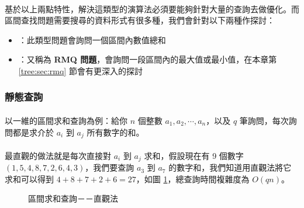 \documentclass[12pt,a4paper,oneside]{report}
\begin{document}
\begin{CJK}{UTF8}{bkai}
\paragraph{}基於以上兩點特性，解決這類型的演算法必須要能夠針對大量的查詢去做優化。而區間查找問題需要搜尋的資料形式有很多種，我們會針對以下兩種作探討：
\begin{itemize}
\item {}：此類型問題會詢問一個區間內數值總和
\item {}：又稱為 \textbf{RMQ 問題}，會詢問一段區間內的最大值或最小值，在本章第 \ref{tree:sec:rmq} 節會有更深入的探討
\end{itemize}

\subsubsection{靜態查詢}

\paragraph{}以一維的區間求和查詢為例：給你 $n$ 個整數 $a_1,a_2,\cdots{},a_n$，以及 $q$ 筆詢問，每次詢問都是求介於 $a_i$ 到 $a_j$ 所有數字的和。

\paragraph{}最直觀的做法就是每次直接對 $a_i$ 到 $a_j$ 求和，假設現在有 9 個數字 $(1,5,4,8,7,2,6,4,3)$，我們要查詢 $a_3$ 到 $a_7$ 的數字和，我們知道用直觀法將它求和可以得到 $4+8+7+2+6=27$，如圖 \ref{tree:fig:rsq:naive}，總查詢時間複雜度為 $O(qn)$。

\begin{figure}[h]
\centering
{}
\caption{區間求和查詢－－直觀法}
\label{tree:fig:rsq:naive}
\end{figure}


\end{CJK}
\end{document}
